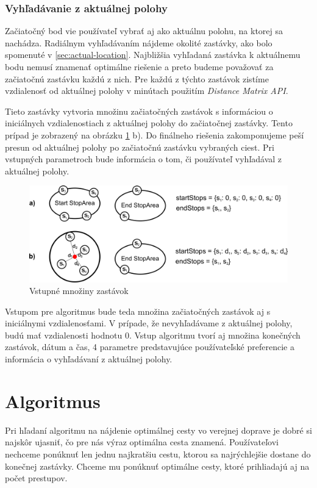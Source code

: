\subsubsection{Vyhľadávanie z aktuálnej polohy}
Začiatočný bod vie používateľ vybrať aj ako aktuálnu polohu, na ktorej sa nachádza. Radiálnym vyhľadávaním nájdeme okolité zastávky, ako bolo spomenuté v \ref{sec:actual-location}. Najbližšia vyhľadaná zastávka k aktuálnemu bodu nemusí znamenať optimálne riešenie a preto budeme považovať za začiatočnú zastávku každú z nich. Pre každú z týchto zastávok zistíme vzdialenosť od aktuálnej polohy  v minútach použitím \textit{Distance Matrix API}. 

Tieto zastávky vytvoria množinu začiatočných zastávok s informáciou o iniciálnych vzdialenostiach z aktuálnej polohy do začiatočnej zastávky. Tento prípad je zobrazený na obrázku \ref{fig:initial-parameters} b). Do finálneho riešenia zakomponujeme peší presun od aktuálnej polohy po začiatočnú zastávku vybraných ciest. Pri vstupných parametroch bude informácia o tom, či používateľ vyhľadával z aktuálnej polohy.

\begin{figure}[H]
\centerline{\includegraphics[width=1.0\textwidth]{images/initial-parameters}}
\caption[Vstupné množiny zastávok]{Vstupné množiny zastávok}
\label{fig:initial-parameters}
\end{figure} 

Vstupom pre algoritmus bude teda množina začiatočných zastávok aj s iniciálnymi vzdialenosťami. V prípade, že nevyhľadávame z aktuálnej polohy, budú mať vzdialenosti hodnotu 0. Vstup algoritmu tvorí aj množina konečných zastávok, dátum a čas, 4 parametre predstavujúce používateľské preferencie a informácia o vyhľadávaní z aktuálnej polohy.

\section{Algoritmus}
Pri hľadaní algoritmu na nájdenie optimálnej cesty vo verejnej doprave je dobré si najskôr ujasniť, čo pre nás výraz optimálna cesta znamená. Používateľovi nechceme ponúknuť len jednu najkratšiu cestu, ktorou sa  najrýchlejšie dostane do konečnej zastávky. Chceme mu ponúknuť optimálne cesty, ktoré prihliadajú aj na počet prestupov.


